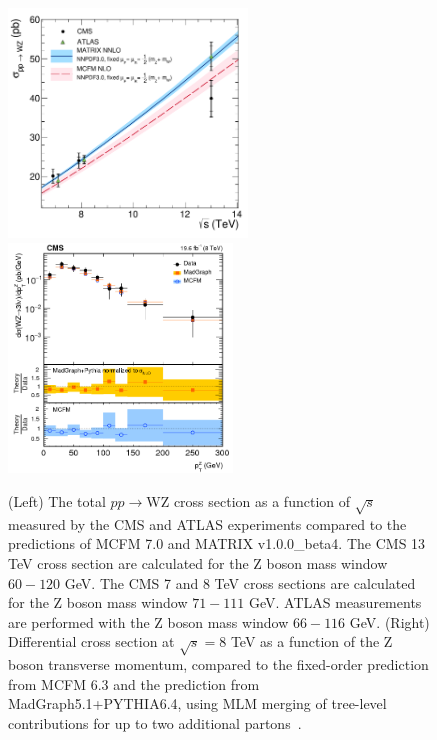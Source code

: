 \documentclass[10pt]{article}
\begin{document}
\begin{figure}[htb]
  \centering
    \includegraphics[height=2.4in]{figures/WZCrossSection_vs_sqrtS.pdf}
    \includegraphics[height=2.4in]{figures/WZ8TeV_ptZ_unfolded.png}
    \caption{ (Left) The total $pp \rightarrow $WZ cross section
      as a function of $\sqrt{s}$ measured by the CMS and 
      ATLAS experiments compared to the predictions of \textsc{MCFM} 7.0 and \textsc{MATRIX} v1.0.0\_beta4. 
      The CMS 13 TeV cross section are calculated for the Z boson mass window $60 - 120$ GeV. 
      The CMS 7 and 8  TeV  cross sections are calculated for the Z boson mass window $71 - 111$ GeV.
      ATLAS measurements are performed with the Z boson mass window $66 - 116$  GeV.
      (Right) Differential cross section at $\sqrt{s} = 8$ TeV as a function
      of the Z boson transverse momentum, compared to
      the fixed-order prediction from \textsc{MCFM} 6.3 and the prediction from
      MadGraph5.1+\textsc{PYTHIA}6.4, using MLM merging of tree-level contributions 
      for up to two additional partons~\cite{Khachatryan:2016poo}.
      }
  \label{fig:WZfigs}
\end{figure}
\end{document}
